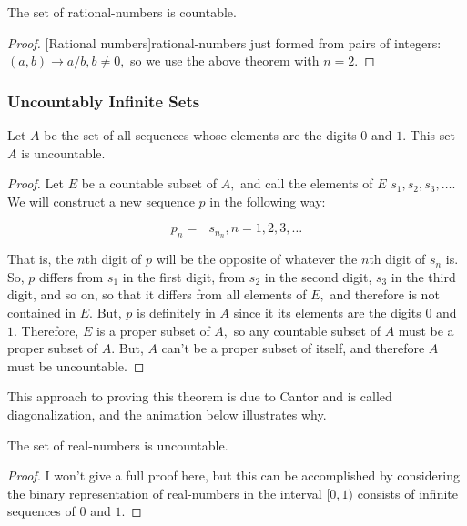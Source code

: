 \documentclass{article}
\begin{document}
\begin{corollary}\label{rationals-are-countable}
The set of \@{rational-numbers} is \@{countable}.
\end{corollary}

\begin{proof}
\@[Rational numbers]{rational-numbers} just formed from pairs of \@{integers}: $(a, b) \to a/b, b \neq 0,$ so we use the above theorem with $n = 2.$
\end{proof}


\subsubsection{Uncountably Infinite Sets}

\begin{theorem}\label{binary-sequences-are-uncountable}
Let $A$ be the set of all \@{sequences} whose \@{elements} are the digits $0$ and $1$. This set $A$ is \@{uncountable}.
\end{theorem}

\begin{proof}
Let $E$ be a \@{countable} \@{subset} of $A,$ and call the elements of $E$ $s_1, s_2, s_3, \dots.$ We will construct a new \@{sequence} $p$ in the following way:

\[ p_n = \neg s_{n_n}, n = 1, 2, 3, \dots \]

That is, the $n$th digit of $p$ will be the opposite of whatever the $n$th digit of $s_n$ is. So, $p$ differs from $s_1$ in the first digit, from $s_2$ in the second digit, $s_3$ in the third digit, and so on, so that it differs from all elements of $E,$ and therefore is not contained in $E.$ But, $p$ is definitely in $A$ since it its elements are the digits $0$ and $1.$ Therefore, $E$ is a proper subset of $A,$ so any countable subset of $A$ must be a proper subset of $A.$ But, $A$ can't be a proper subset of itself, and therefore $A$ must be \@{uncountable}.
\end{proof}

\begin{note}
This approach to proving this theorem is due to Cantor and is called diagonalization, and the animation below illustrates why.
\end{note}

\begin{corollary}\label{reals-are-uncountable}
The set of \@{real-numbers} is \@{uncountable}.
\end{corollary}

\begin{proof}
I won't give a full proof here, but this can be accomplished by considering the binary representation of \@{real-numbers} in the \@{interval} $[0, 1)$ consists of infinite \@{sequences} of $0$ and $1$.
\end{proof}

\end{document}
